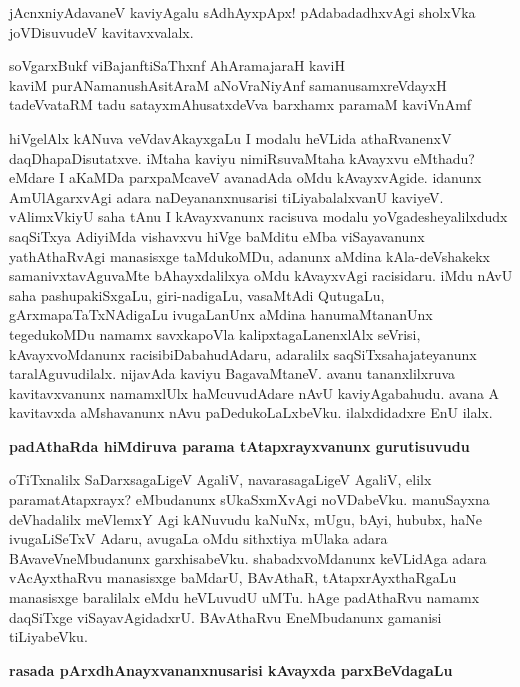 \noindent
jAcnxniyAdavaneV kaviyAgalu sAdhAyxpApx! pAdabadadhxvAgi sholxVka joVDisuvudeV kavitavxvalalx.

\begin{shloka}
soVgarxBukf viBajanftiSaThxnf AhAramajaraH kaviH\\\label{239b}
kaviM purANamanushAsitAraM aNoVraNiyAnf samanusamxreVdayxH\\
tadeVvataRM tadu satayxmAhusatxdeVva barxhamx paramaM kaviVnAmf\label{239c}
\end{shloka}                    

hiVgelAlx kANuva veVdavAkayxgaLu I modalu heVLida athaRvanenxV daqDhapaDisutatxve. iMtaha kaviyu nimiRsuvaMtaha kAvayxvu eMthadu? eMdare I aKaMDa parxpaMcaveV avanadAda oMdu kAvayxvAgide. idanunx AmUlAgarxvAgi adara naDeyananxnusarisi tiLiyabalalxvanU kaviyeV. vAlimxVkiyU saha tAnu I kAvayxvanunx racisuva modalu yoVgadesheyalilxdudx saqSiTxya AdiyiMda vishavxvu hiVge baMditu eMba viSayavanunx yathAthaRvAgi manasisxge taMdukoMDu, adanunx aMdina kAla-deVshakekx samanivxtavAguvaMte bAhayxdalilxya oMdu kAvayxvAgi racisidaru. iMdu nAvU saha pashupakiSxgaLu, giri-nadigaLu, vasaMtAdi QutugaLu, gArxmapaTaTxNAdigaLu ivugaLanUnx aMdina hanumaMtananUnx tegedukoMDu namamx savxkapoVla kalipxtagaLanenxlAlx seVrisi, kAvayxvoMdanunx racisibiDabahudAdaru, adaralilx saqSiTxsahajateyanunx taralAguvudilalx. nijavAda kaviyu BagavaMtaneV. avanu tananxlilxruva kavitavxvanunx namamxlUlx haMcuvudAdare nAvU kaviyAgabahudu. avana A kavitavxda aMshavanunx nAvu paDedukoLaLxbeVku. ilalxdidadxre EnU ilalx.

{\bigskip
\noindent
{\large\bf padAthaRda hiMdiruva parama tAtapxrayxvanunx gurutisuvudu}}\label{page240}
\medskip

\noindent
oTiTxnalilx SaDarxsagaLigeV AgaliV, navarasagaLigeV AgaliV, elilx paramatAtapxrayx? eMbudanunx sUkaSxmXvAgi noVDabeVku. manuSayxna deVhadalilx meVlemxY Agi kANuvudu kaNuNx, mUgu, bAyi, hububx, haNe ivugaLiSeTxV Adaru, avugaLa oMdu sithxtiya mUlaka adara BAvaveVneMbudanunx garxhisabeVku. shabadxvoMdanunx keVLidAga adara vAcAyxthaRvu manasisxge baMdarU, BAvAthaR, tAtapxrAyxthaRgaLu manasisxge baralilalx eMdu heVLuvudU uMTu. hAge padAthaRvu namamx daqSiTxge viSayavAgidadxrU. BAvAthaRvu EneMbudanunx gamanisi tiLiyabeVku.

{\medskip
\noindent
{\large\bf rasada pArxdhAnayxvananxnusarisi kAvayxda parxBeVdagaLu}}\label{page240a}
\smallskip

